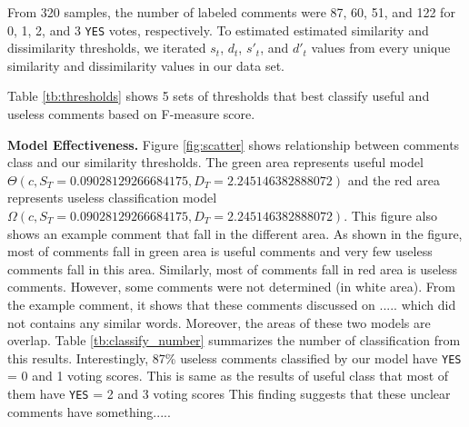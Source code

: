
%

From 320 samples, the number of labeled comments were 87, 60, 51, and 122 for 0, 1, 2, and 3 \texttt{YES} votes, respectively.
To estimated estimated similarity and dissimilarity thresholds, we iterated $s_t$, $d_t$, $s'_t$, and $d'_t$ values from every unique similarity and dissimilarity values in our data set.
  
Table \ref{tb:thresholds} shows 5 sets of thresholds that best classify useful and useless comments based on F-measure score.   

\textbf{Model Effectiveness.} Figure \ref{fig:scatter} shows relationship between comments class and our similarity thresholds. The green area represents useful model $\Theta(c,S_T=0.09028129266684175,D_T= 2.245146382888072)$ and the red area represents useless classification model $\Omega(c,S_T=0.09028129266684175,D_T= 2.245146382888072)$. This figure also shows an example comment that fall in the different area. As shown in the figure, most of comments fall in green area is useful comments and very few useless comments fall in this area. Similarly, most of comments fall in red area is useless comments. However, some comments were not determined (in white area). From the example comment, it shows that these comments discussed on ..... which did not contains any similar words. Moreover, the areas of these two models are overlap. Table \ref{tb:classify_number} summarizes the number of classification from this results. Interestingly, 87\% useless comments classified by our model have \texttt{YES} = 0 and 1 voting scores. This is same as the results of useful class that most of them have \texttt{YES} = 2 and 3 voting scores
This finding suggests that these unclear comments have something.....

